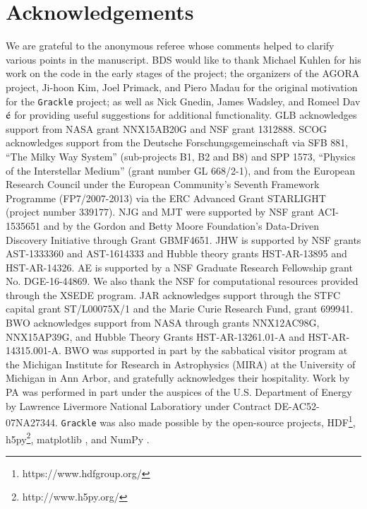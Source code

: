 \section*{Acknowledgements}

We are grateful to the anonymous referee whose comments helped to
clarify various points in the manuscript.
BDS would like to thank Michael Kuhlen for his work on the code in the
early stages of the project; the organizers of the AGORA project,
Ji-hoon Kim, Joel Primack, and Piero Madau for the original motivation
for the \texttt{Grackle} project; as well as Nick Gnedin, James
Wadsley, and Romeel Dav$\acute{\rm e}$ for providing useful
suggestions for additional functionality.  GLB acknowledges support
from NASA grant NNX15AB20G and NSF grant 1312888. SCOG acknowledges
support from the Deutsche Forschungsgemeinschaft via SFB 881, ``The
Milky Way System'' (sub-projects B1, B2 and B8) and SPP 1573,
``Physics of the Interstellar Medium'' (grant number GL 668/2-1), and
from the European Research Council under the European Community's
Seventh Framework Programme (FP7/2007-2013) via the ERC Advanced Grant
STARLIGHT (project number 339177).  NJG and MJT were supported by NSF
grant ACI-1535651 and by the Gordon and Betty Moore Foundation's
Data-Driven Discovery Initiative through Grant GBMF4651.  JHW is
supported by NSF grants AST-1333360 and AST-1614333 and Hubble theory
grants HST-AR-13895 and HST-AR-14326.  AE is supported by a NSF
Graduate Research Fellowship grant No. DGE-16-44869. We also thank the
NSF for computational resources provided through the XSEDE
program. JAR acknowledges support through the STFC capital grant
ST/L00075X/1 and the Marie Curie Research Fund, grant 699941.
BWO acknowledges support from  NASA through grants
NNX12AC98G, NNX15AP39G, and Hubble Theory Grants HST-AR-13261.01-A and
HST-AR-14315.001-A.  BWO was supported in part by the sabbatical
visitor program at the Michigan Institute for Research in Astrophysics
(MIRA) at the University of Michigan in Ann Arbor, and gratefully
acknowledges their hospitality.
Work by PA was performed in part under the auspices of
the U.S. Department of Energy by Lawrence Livermore National
Laboratiory under Contract DE-AC52-07NA27344.  \texttt{Grackle} was
also made possible by the open-source projects,
HDF\footnote{https://www.hdfgroup.org/},
h5py\footnote{http://www.h5py.org/}, matplotlib
\citep{2005ASPC..347...91B}, and NumPy \citep{numpy}.

